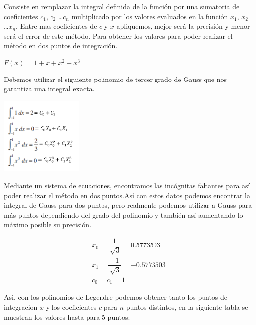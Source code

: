 \documentclass[journal,transmag]{IEEEtran}
\theoremstyle{mytheoremstyle}
\theoremstyle{mytheoremstyle}
\theoremstyle{myproblemstyle}
\begin{document}
            
            Consiste en remplazar la integral definida de la función por una sumatoria de coeficientes $c_1$, $c_2$ …$c_n$ multiplicado por los valores evaluados en la función $x_1$, $x_2$ …$x_n$. Entre mas coeficientes de $c$ y $x$ apliquemos, mejor será la precisión y menor será el error de este método. Para obtener los valores para poder realizar el método en dos puntos de integración.
            
            \begin{center}
                $F(x)=1+x+x^2+x^3$
            \end{center}
                
                
            
            
            Debemos utilizar el siguiente polinomio de tercer grado de Gauss que nos garantiza  una integral exacta. 
            
            
            \includegraphics[width=4cm]{images/puntosX_C.PNG}
            
            
            Mediante un sistema de ecuaciones, encontramos las incógnitas faltantes para así poder realizar el método en dos puntos.Así con estos datos podemos encontrar la integral de Gauss para dos puntos, pero realmente podemos utilizar a Gauss para más puntos dependiendo del grado del polinomio y también así aumentando lo máximo posible su precisión.
            
            \begin{align*}
                x_0=\dfrac{1}{\sqrt[]{3}}=0.5773503\\
                x_1=\dfrac{-1}{\sqrt[]{3}}=-0.5773503\\
                c_0=c_1=1
            \end{align*}
             
             Asi, con los polinomios de Legendre podemos obtener tanto los puntos de integracion $x$ y los coeficientes $c$ para $n$ puntos distintos, en la siguiente tabla se muestran los valores hasta para 5 puntos:
             
\end{document}
